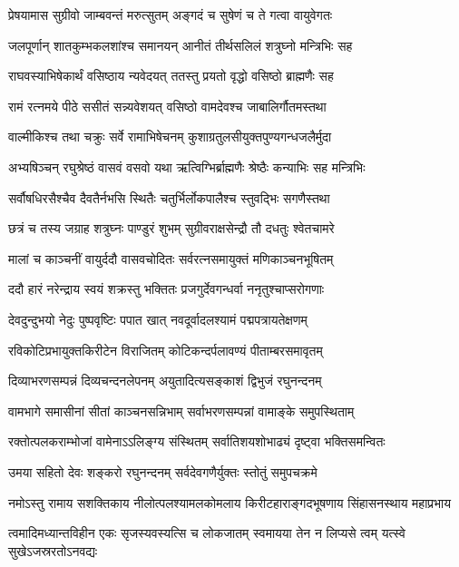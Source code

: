\twolineshloka
{प्रेषयामास सुग्रीवो जाम्बवन्तं मरुत्सुतम्}
{अङ्गदं च सुषेणं च ते गत्वा वायुवेगतः} %

\twolineshloka
{जलपूर्णान् शातकुम्भकलशांश्च समानयन्}
{आनीतं तीर्थसलिलं शत्रुघ्नो मन्त्रिभिः सह} %

\twolineshloka
{राघवस्याभिषेकार्थं वसिष्ठाय न्यवेदयत्}
{ततस्तु प्रयतो वृद्धो वसिष्ठो ब्राह्मणैः सह} %

\twolineshloka
{रामं रत्नमये पीठे ससीतं सन्न्यवेशयत्}
{वसिष्ठो वामदेवश्च जाबालिर्गौतमस्तथा} %

\twolineshloka
{वाल्मीकिश्च तथा चक्रुः सर्वे रामाभिषेचनम्}
{कुशाग्रतुलसीयुक्तपुण्यगन्धजलैर्मुदा} %

\twolineshloka
{अभ्यषिञ्चन् रघुश्रेष्ठं वासवं वसवो यथा}
{ऋत्विग्भिर्ब्राह्मणैः श्रेष्ठैः कन्याभिः सह मन्त्रिभिः} %

\twolineshloka
{सर्वौषधिरसैश्चैव दैवतैर्नभसि स्थितैः}
{चतुर्भिर्लोकपालैश्च स्तुवद्भिः सगणैस्तथा} %

\twolineshloka
{छत्रं च तस्य जग्राह शत्रुघ्नः पाण्डुरं शुभम्}
{सुग्रीवराक्षसेन्द्रौ तौ दधतुः श्वेतचामरे} %

\twolineshloka
{मालां च काञ्चनीं वायुर्ददौ वासवचोदितः}
{सर्वरत्नसमायुक्तं मणिकाञ्चनभूषितम्} %

\twolineshloka
{ददौ हारं नरेन्द्राय स्वयं शक्रस्तु भक्तितः}
{प्रजगुर्देवगन्धर्वा ननृतुश्चाप्सरोगणाः} %

\twolineshloka
{देवदुन्दुभयो नेदुः पुष्पवृष्टिः पपात खात्}
{नवदूर्वादलश्यामं पद्मपत्रायतेक्षणम्} %

\twolineshloka
{रविकोटिप्रभायुक्तकिरीटेन विराजितम्}
{कोटिकन्दर्पलावण्यं पीताम्बरसमावृतम्} %

\twolineshloka
{दिव्याभरणसम्पन्नं दिव्यचन्दनलेपनम्}
{अयुतादित्यसङ्काशं द्विभुजं रघुनन्दनम्} %

\twolineshloka
{वामभागे समासीनां सीतां काञ्चनसन्निभाम्}
{सर्वाभरणसम्पन्नां वामाङ्के समुपस्थिताम्} %

\twolineshloka
{रक्तोत्पलकराम्भोजां वामेनाऽऽलिङ्ग्य संस्थितम्}
{सर्वातिशयशोभाढ्यं दृष्ट्वा भक्तिसमन्वितः} %

\twolineshloka
{उमया सहितो देवः शङ्करो रघुनन्दनम्}
{सर्वदेवगणैर्युक्तः स्तोतुं समुपचक्रमे} %


\fourlineindentedshloka
{नमोऽस्तु रामाय सशक्तिकाय}
{नीलोत्पलश्यामलकोमलाय}
{किरीटहाराङ्गदभूषणाय}
{सिंहासनस्थाय महाप्रभाय} %

\fourlineindentedshloka
{त्वमादिमध्यान्तविहीन एकः}
{सृजस्यवस्यत्सि च लोकजातम्}
{स्वमायया तेन न लिप्यसे त्वम्}
{यत्स्वे सुखेऽजस्ररतोऽनवद्यः} %

